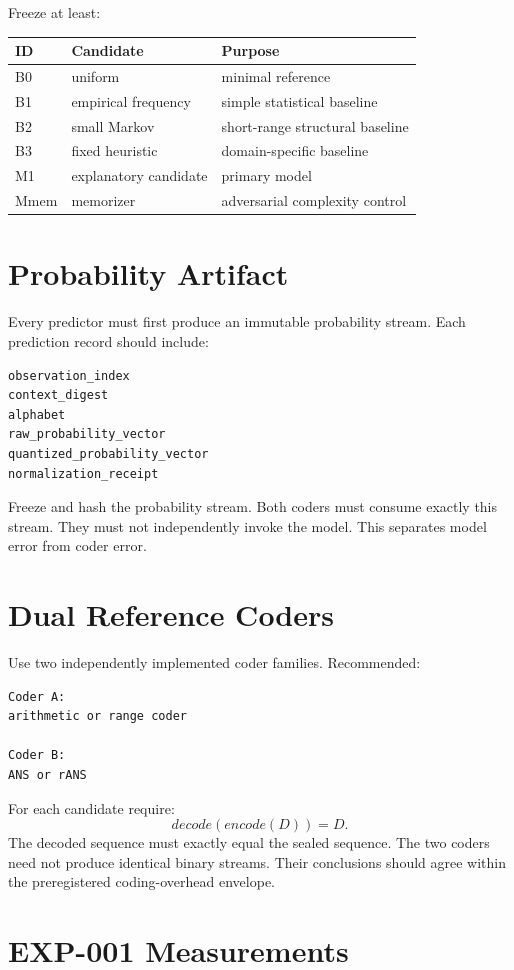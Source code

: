 \documentclass[11pt]{article}
\begin{document}
Freeze at least:

\begin{center}
\begin{tabular}{lll}
\toprule
ID & Candidate & Purpose \\
\midrule
B0 & uniform & minimal reference \\
B1 & empirical frequency & simple statistical baseline \\
B2 & small Markov & short-range structural baseline \\
B3 & fixed heuristic & domain-specific baseline \\
M1 & explanatory candidate & primary model \\
Mmem & memorizer & adversarial complexity control \\
\bottomrule
\end{tabular}
\end{center}

\section{Probability Artifact}

Every predictor must first produce an immutable probability stream. Each prediction record should include:
\begin{verbatim}
observation_index
context_digest
alphabet
raw_probability_vector
quantized_probability_vector
normalization_receipt
\end{verbatim}
Freeze and hash the probability stream. Both coders must consume exactly this stream. They must not independently invoke the model. This separates model error from coder error.

\section{Dual Reference Coders}

Use two independently implemented coder families. Recommended:
\begin{verbatim}
Coder A:
arithmetic or range coder

Coder B:
ANS or rANS
\end{verbatim}
For each candidate require:
\[
decode(encode(D)) = D.
\]
The decoded sequence must exactly equal the sealed sequence. The two coders need not produce identical binary streams. Their conclusions should agree within the preregistered coding-overhead envelope.

\section{EXP-001 Measurements}
\end{document}
